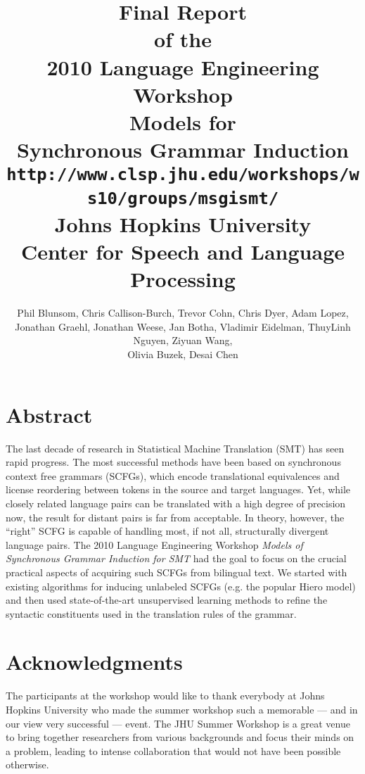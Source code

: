 \documentclass[11pt]{report}
\renewcommand{\emph}{\it}
\theoremstyle{plain}
\begin{document}
\title{\vspace{-15mm}\LARGE {\bf Final Report}\\[2mm]
of the\\[2mm]
2010 Language Engineering Workshop\\[15mm]
{\huge \bf Models for\\
Synchronous Grammar Induction\\[2mm]
{\tt \Large http://www.clsp.jhu.edu/workshops/ws10/groups/msgismt/}\\[15mm]
Johns Hopkins University\\[2mm]
Center for Speech and Language Processing}}
\author{\large Phil Blunsom,
Chris Callison-Burch,
Trevor Cohn,
Chris Dyer,
Adam Lopez,\\
\large
Jonathan Graehl,
Jonathan Weese,
Jan Botha,
Vladimir Eidelman,
ThuyLinh Nguyen,
Ziyuan Wang, \\
\large Olivia Buzek, Desai Chen}
\normalsize

\maketitle

\section*{Abstract}
The last decade of research in Statistical Machine Translation (SMT) has seen rapid progress. The most successful methods have been based on synchronous context free grammars (SCFGs), which encode translational equivalences and license reordering between tokens in the source and target languages. Yet, while closely related language pairs can be translated with a high degree of precision now, the result for distant pairs is far from acceptable. In theory, however, the ``right'' SCFG is capable of handling most, if not all, structurally divergent language pairs. The 2010 Language Engineering Workshop {\emph Models of Synchronous Grammar Induction for SMT} had the goal to focus on the crucial practical aspects of acquiring such SCFGs from bilingual text. We started with existing algorithms for inducing unlabeled SCFGs (e.g. the popular Hiero model) and then used state-of-the-art unsupervised learning methods to refine the syntactic constituents used in the translation rules of the grammar.

\phantom{.}


\newpage
\section*{Acknowledgments}
The participants at the workshop would like to thank everybody at Johns Hopkins University who made the summer workshop such a memorable --- and in our view very successful --- event. The JHU Summer Workshop is a great venue to bring together researchers from various backgrounds and focus their minds on a problem, leading to intense collaboration that would not have been possible otherwise.
\end{document}
